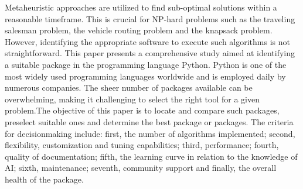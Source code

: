 
\begin{Abstrakt}
    Metaheuristic approaches are utilized to find sub-optimal solutions within a reasonable timeframe. This is crucial for NP-hard problems such as the traveling salesman problem, the vehicle routing problem and the knapsack problem. However, identifying the appropriate software to execute such algorithms is not straightforward. This paper presents a comprehensive study aimed at identifying a suitable package in the programming language Python. Python is one of the most widely used programming languages worldwide and is employed daily by numerous companies. The sheer number of packages available can be overwhelming, making it challenging to select the right tool for a given problem.The objective of this paper is to locate and compare such packages, preselect suitable ones and determine the best package or packages. The criteria for decisionmaking include: first, the number of algorithms implemented; second, flexibility, customization and tuning capabilities; third, performance; fourth, quality of documentation; fifth, the learning curve in relation to the knowledge of AI; sixth, maintenance; seventh, community support and finally, the overall health of the package.
\end{Abstrakt}



\clearpage
